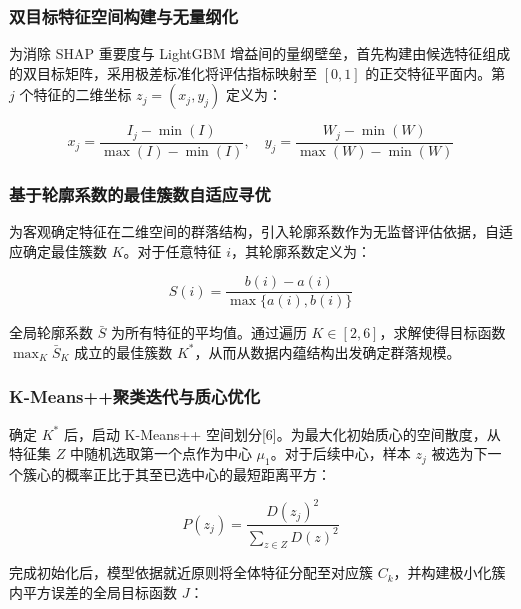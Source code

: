 \documentclass[12pt]{article}
\begin{document}
	\subsubsection{双目标特征空间构建与无量纲化}
	{\songti{}
		为消除 SHAP 重要度与 LightGBM 增益间的量纲壁垒，首先构建由候选特征组成的双目标矩阵，采用极差标准化将评估指标映射至 $[0,1]$ 的正交特征平面内。第 $j$ 个特征的二维坐标 $z_j = (x_j, y_j)$ 定义为：
		\par}
	
	\begin{equation}
		x_j = \frac{I_j - \min(I)}{\max(I) - \min(I)}, \quad y_j = \frac{W_j - \min(W)}{\max(W) - \min(W)}
	\end{equation}
	
	\subsubsection{基于轮廓系数的最佳簇数自适应寻优}
	{\songti{}
		为客观确定特征在二维空间的群落结构，引入轮廓系数作为无监督评估依据，自适应确定最佳簇数 $K$。对于任意特征 $i$，其轮廓系数定义为：
		\par}
	
	\begin{equation}
		S(i) = \frac{b(i) - a(i)}{\max\{a(i), b(i)\}}
	\end{equation}
	
	{\songti{}
		全局轮廓系数 $\bar{S}$ 为所有特征的平均值。通过遍历 $K \in [2,6]$，求解使得目标函数 $\max_{K} \bar{S}_K$ 成立的最佳簇数 $K^*$，从而从数据内蕴结构出发确定群落规模。
		\par}
	
	\subsubsection{K-Means++聚类迭代与质心优化}
	{\songti{}
		确定 $K^*$ 后，启动 K-Means++ 空间划分[6]。为最大化初始质心的空间散度，从特征集 $Z$ 中随机选取第一个点作为中心 $\mu_1$。对于后续中心，样本 $z_j$ 被选为下一个簇心的概率正比于其至已选中心的最短距离平方：
		\par}
	
	\begin{equation}
		P(z_j) = \frac{D(z_j)^2}{\sum_{z \in Z} D(z)^2}
	\end{equation}
	
	{\songti{}
		完成初始化后，模型依据就近原则将全体特征分配至对应簇 $C_k$，并构建极小化簇内平方误差的全局目标函数 $J$：
		\par}
	
\end{document}
